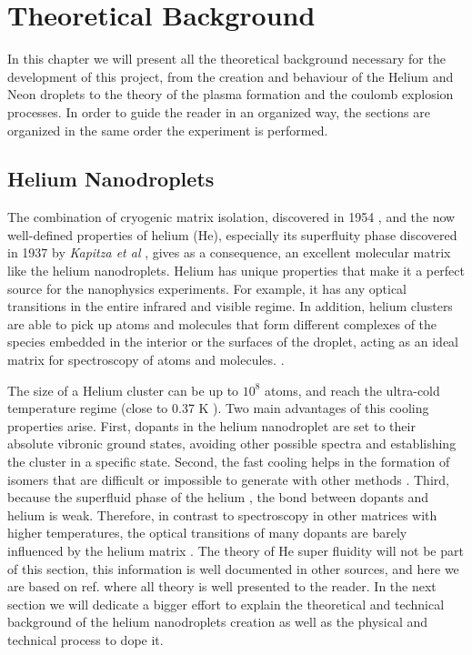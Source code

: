 \chapter{Theoretical Background}

In this chapter we will present all the theoretical background necessary for the development of this project, from the creation and behaviour of the Helium and Neon droplets to the theory of the plasma formation and the coulomb explosion processes. In order to guide the reader in an organized way, the sections are organized in the same order the experiment is performed.


\section{Helium Nanodroplets}

The combination of cryogenic matrix isolation, discovered in 1954 \cite{whittle_matrix_1954}, and the now well-defined properties of helium (He), especially its superfluity phase discovered in 1937 by \textit{Kapitza et al} \cite{kapitza_viscosity_1938}, gives as a consequence, an excellent molecular matrix like the helium nanodroplets.
Helium has unique properties that make it a perfect source for the nanophysics experiments. For example, it has any optical transitions in the entire infrared and visible regime. In addition, helium clusters are able to pick up atoms and molecules that form different complexes of the species embedded in the interior or the surfaces of the droplet, acting as an ideal matrix for spectroscopy of atoms and molecules. \cite{stienkemeier_spectroscopy_2006}\cite{toennies_superfluid_2004}.

The size of a Helium cluster can be up to $10^{8}$ atoms, and reach the ultra-cold temperature regime (close to 0.37 K \cite{toennies_spectroscopy_1998})\cite{enss_low-temperature_2005}.
Two main advantages of this cooling properties arise. First, dopants in the helium nanodroplet are set to their absolute vibronic ground states, avoiding other possible spectra and establishing the cluster in a specific state. Second, the fast cooling helps in the formation of isomers that are difficult or impossible to generate with other methods \cite{nauta_nonequilibrium_1999}. Third, because the superfluid phase of the helium \cite{grebenev_superfluidity_1998}, the bond between dopants and helium is weak. Therefore, in contrast to spectroscopy in other matrices with higher temperatures, the optical transitions of many dopants are barely influenced by the helium matrix \cite{toennies_superfluid_2004}. 
The theory of He super fluidity will not be part of this section, this information is well documented in other sources, and here we are based on ref.\cite{enss_low-temperature_2005} where all theory is well presented to the reader. In the next section we will dedicate a bigger effort to explain the theoretical and technical background of the helium nanodroplets creation as well as the physical and technical process to dope it. 


